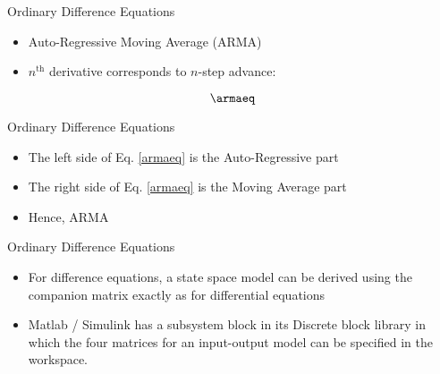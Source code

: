 \begin{frame}
Ordinary Difference Equations
\begin{itemize}
  \item Auto-Regressive Moving Average (ARMA)
  \item $n^{\text{th}}$ derivative corresponds to $n$-step advance:
\end{itemize} 
\begin{equation}\label{armaeq}
\armaeq
\end{equation}
\end{frame}
\begin{frame}
Ordinary Difference Equations
\begin{itemize}
  \item The left side of Eq. \eqref{armaeq} is the Auto-Regressive part
  \item The right side of Eq. \eqref{armaeq} is the Moving Average part
  \item Hence, ARMA
\end{itemize} 
\end{frame}
\begin{frame}
Ordinary Difference Equations
\begin{itemize}
  \item For difference equations, a state space model can be derived using the companion matrix exactly as for differential equations
  \item Matlab / Simulink has a subsystem block in its Discrete block library in which the four matrices for an input-output model can be specified in the workspace.
\end{itemize} 
\end{frame}
